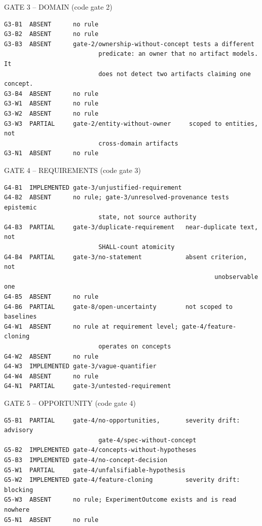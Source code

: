 \documentclass[11pt,a4paper]{article}
\begin{document}
GATE 3 -- DOMAIN (code gate 2)

\begin{Verbatim}[fontsize=\footnotesize,breaklines=true,breakanywhere=true,breakautoindent=false,samepage=false]
G3-B1  ABSENT      no rule
G3-B2  ABSENT      no rule
G3-B3  ABSENT      gate-2/ownership-without-concept tests a different
                          predicate: an owner that no artifact models. It
                          does not detect two artifacts claiming one concept.
G3-B4  ABSENT      no rule
G3-W1  ABSENT      no rule
G3-W2  ABSENT      no rule
G3-W3  PARTIAL     gate-2/entity-without-owner     scoped to entities, not
                          cross-domain artifacts
G3-N1  ABSENT      no rule
\end{Verbatim}

GATE 4 -- REQUIREMENTS (code gate 3)

\begin{Verbatim}[fontsize=\footnotesize,breaklines=true,breakanywhere=true,breakautoindent=false,samepage=false]
G4-B1  IMPLEMENTED gate-3/unjustified-requirement
G4-B2  ABSENT      no rule; gate-3/unresolved-provenance tests epistemic
                          state, not source authority
G4-B3  PARTIAL     gate-3/duplicate-requirement   near-duplicate text, not
                          SHALL-count atomicity
G4-B4  PARTIAL     gate-3/no-statement            absent criterion, not
                                                          unobservable one
G4-B5  ABSENT      no rule
G4-B6  PARTIAL     gate-8/open-uncertainty        not scoped to baselines
G4-W1  ABSENT      no rule at requirement level; gate-4/feature-cloning
                          operates on concepts
G4-W2  ABSENT      no rule
G4-W3  IMPLEMENTED gate-3/vague-quantifier
G4-W4  ABSENT      no rule
G4-N1  PARTIAL     gate-3/untested-requirement
\end{Verbatim}

GATE 5 -- OPPORTUNITY (code gate 4)

\begin{Verbatim}[fontsize=\footnotesize,breaklines=true,breakanywhere=true,breakautoindent=false,samepage=false]
G5-B1  PARTIAL     gate-4/no-opportunities,       severity drift: advisory
                          gate-4/spec-without-concept
G5-B2  IMPLEMENTED gate-4/concepts-without-hypotheses
G5-B3  IMPLEMENTED gate-4/no-concept-decision
G5-W1  PARTIAL     gate-4/unfalsifiable-hypothesis
G5-W2  IMPLEMENTED gate-4/feature-cloning         severity drift: blocking
G5-W3  ABSENT      no rule; ExperimentOutcome exists and is read nowhere
G5-N1  ABSENT      no rule
\end{Verbatim}
\end{document}

